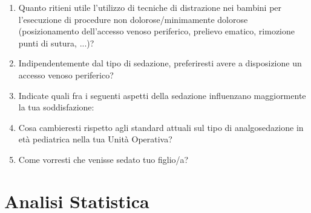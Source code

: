 \begin{tcolorbox}
\begin{enumerate}
           \item Quanto ritieni utile l’utilizzo di tecniche di distrazione nei bambini per l’esecuzione di procedure non dolorose/minimamente dolorose (posizionamento dell'accesso venoso periferico, prelievo ematico, rimozione punti di sutura, ...)?
           
           \item Indipendentemente dal tipo di sedazione, preferiresti avere a disposizione un accesso venoso periferico?
\newpage
           \item Indicate quali fra i seguenti aspetti della sedazione influenzano maggiormente la tua soddisfazione:
           \item Cosa cambieresti rispetto agli standard attuali sul tipo di analgosedazione in età pediatrica nella tua Unità Operativa? 
           
           \item Come vorresti che venisse sedato tuo figlio/a? 
           
           

\end{enumerate}

\end{tcolorbox}

\section{Analisi Statistica}


